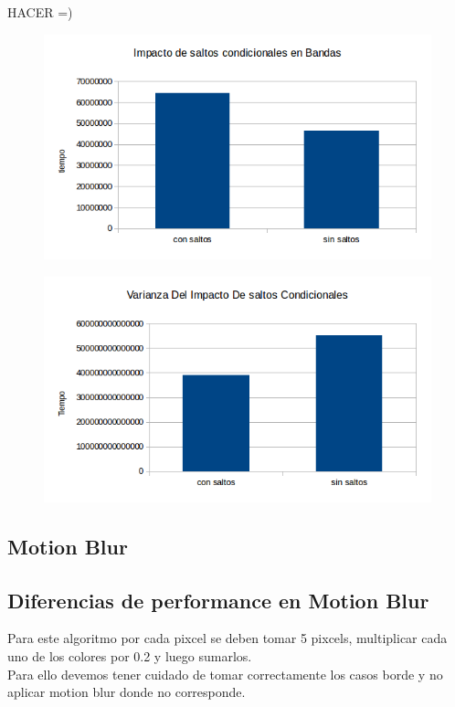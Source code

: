 \documentclass[a4paper]{article}
\begin{document}
HACER =)

\begin{figure}[h!]
  \begin{center}
  \includegraphics[scale=0.66]{Graficos3.1/per.png}
  \label{nombreparareferenciar1}
  \end{center}
\end{figure}

\begin{figure}[h!]
  \begin{center}
  \includegraphics[scale=0.66]{Graficos3.1/var.png}
  \label{nombreparareferenciar1}
  \end{center}
\end{figure}

\newpage
\subsection{Motion Blur}
\subsection{Diferencias de performance en Motion Blur}
Para este algoritmo por cada pixcel se deben tomar 5 pixcels, multiplicar cada uno de los colores por 0.2 y luego sumarlos.
\\
Para ello devemos tener cuidado de tomar correctamente los casos borde y no aplicar motion blur donde no corresponde.
\end{document}
